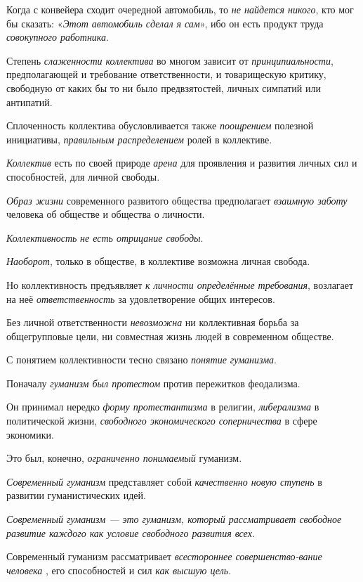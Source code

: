 \documentclass[a4paper,14pt,russian]{extreport}
\begin{document}
Когда с конвейера сходит очередной автомобиль, то \emph{не найдется никого}, кто мог бы сказать: «\emph{Этот автомобиль сделал я сам}», ибо он есть продукт труда \emph{совокупного работника}.

Степень \emph{слаженности коллектива} во многом зависит от \emph{принципиальности}, предполагающей и требование ответственности, и товарищескую критику, свободную от каких бы то ни было предвзятостей, личных симпатий или антипатий.

Сплоченность коллектива обусловливается также \emph{поощрением} полезной инициативы, \emph{правильным распределением} ролей в коллективе.

\emph{Коллектив} есть по своей природе \emph{арена} для проявления и развития личных сил и способностей, для личной свободы.

\emph{Образ жизни} современного развитого общества предполагает \emph{взаимную заботу} человека об обществе и общества о личности.

\emph{Коллективность} \emph{не есть отрицание свободы}.

\emph{Наоборот}, только в обществе, в коллективе возможна личная свобода.

Но коллективность предъявляет \emph{к личности определённые требования}, возлагает на неё \emph{ответственность} за удовлетворение общих интересов.

Без личной ответственности \emph{невозможна} ни коллективная борьба за общегрупповые цели, ни совместная жизнь людей в современном обществе.

С понятием коллективности тесно связано \emph{понятие гуманизма}.

Поначалу \emph{гуманизм был протестом} против пережитков феодализма.

Он принимал нередко \emph{форму протестантизма} в религии, \emph{либерализма} в политической жизни, \emph{свободного экономического соперничества} в сфере экономики.

Это был, конечно, \emph{ограниченно понимаемый} гуманизм.

\emph{Современный гуманизм} представляет собой \emph{качественно новую ступень} в развитии гуманистических идей.

\emph{Современный гуманизм --- это гуманизм, который рассматривает свободное развитие каждого как условие свободного развития всех.}

Современный гуманизм рассматривает \emph{всестороннее совершенство-вание человека} , его способностей и сил \emph{как высшую цель}.
\end{document}
